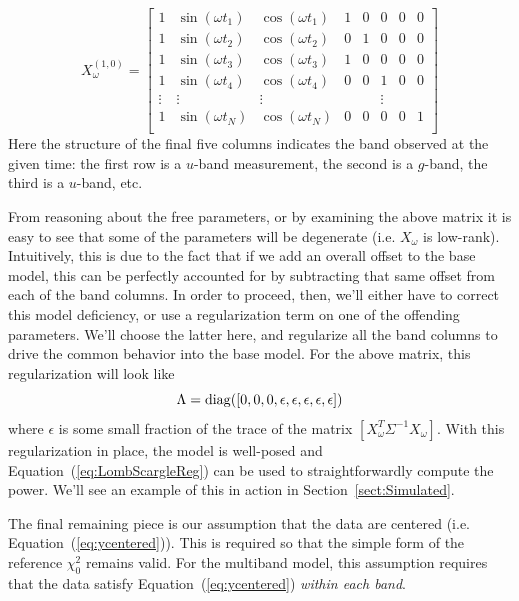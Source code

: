 \documentclass[12pt,preprint]{aastex}
\newcommand{\Eq}[1]{Equation~(\ref{eq:#1})}
\newcommand{\eq}[1]{\Eq{#1}}
\newcommand{\Sect}[1]{Section~\ref{sect:#1}}
\newcommand{\sect}[1]{\Sect{#1}}
\begin{document}
\begin{equation}
X_\omega^{(1,0)} = \left[
\begin{array}{cccccccc}
1 & \sin(\omega t_1) & \cos(\omega t_1) & 1 & 0 & 0 & 0 & 0\\
1 & \sin(\omega t_2) & \cos(\omega t_2) & 0 & 1 & 0 & 0 & 0\\
1 & \sin(\omega t_3) & \cos(\omega t_3) & 1 & 0 & 0 & 0 & 0\\
1 & \sin(\omega t_4) & \cos(\omega t_4) & 0 & 0 & 1 & 0 & 0\\
\vdots & \vdots & \vdots & & & \vdots & &\\
1 & \sin(\omega t_N) & \cos(\omega t_N) & 0 & 0 & 0 & 0 & 1\\
\end{array}
\right]
\end{equation}
Here the structure of the final five columns indicates the band observed at the given time: the first row is a $u$-band measurement, the second is a $g$-band, the third is a $u$-band, etc.

From reasoning about the free parameters, or by examining the above matrix it is easy to see that some of the parameters will be degenerate (i.e. $X_\omega$ is low-rank). Intuitively, this is due to the fact that if we add an overall offset to the base model, this can be perfectly accounted for by subtracting that same offset from each of the band columns. In order to proceed, then, we'll either have to correct this model deficiency, or use a regularization term on one of the offending parameters. We'll choose the latter here, and regularize all the band columns to drive the common behavior into the base model. For the above matrix,
this regularization will look like
\begin{equation}
  \Lambda = {\rm diag}([0, 0, 0, \epsilon, \epsilon, \epsilon, \epsilon, \epsilon])
\end{equation}
where $\epsilon$ is some small fraction of the trace of the matrix $[X_\omega^T\Sigma^{-1}X_\omega]$. With this regularization in place, the model is well-posed and \eq{LombScargleReg} can be used to straightforwardly compute the power. We'll see an example of this in action in \sect{Simulated}.

The final remaining piece is our assumption that the data are centered (i.e. \eq{ycentered}). This is required so that the simple form of the reference $\chi^2_0$ remains valid. For the multiband model, this assumption requires that the data satisfy \eq{ycentered} {\it within each band}.
\end{document}
